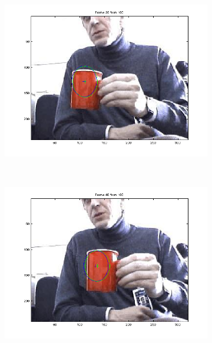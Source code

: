 \documentclass[hyperref={pdfpagelabels=false}]{beamer}
\begin{document}
\begin{frame}
\begin{figure}
\begin{subfigure}[b]{0.3\textwidth}
                 \includegraphics[width=\textwidth]{results/redcup/Frame0020.png}
         \end{subfigure}
         \\
         \begin{subfigure}[b]{0.3\textwidth}
                 \includegraphics[width=\textwidth]{results/redcup/Frame0040.png}
         \end{subfigure}
         \begin{subfigure}[b]{0.3\textwidth}

\end{subfigure}
\end{figure}
\end{frame}
\end{document}
